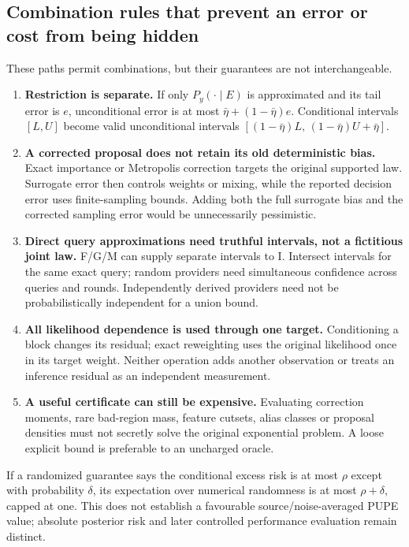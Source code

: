 \documentclass[10pt,a4paper]{article}
\begin{document}
\subsection{Combination rules that prevent an error or cost from being hidden}
These paths permit combinations, but their guarantees are not interchangeable.
\begin{enumerate}
\item \textbf{Restriction is separate.} If only $P_y(\cdot\mid E)$ is approximated and its tail error is $e$,
      unconditional error is at most $\bar\eta+(1-\bar\eta)e$. Conditional intervals $[L,U]$ become valid
      unconditional intervals $[(1-\bar\eta)L,\,(1-\bar\eta)U+\bar\eta]$.
\item \textbf{A corrected proposal does not retain its old deterministic bias.} Exact importance or
      Metropolis correction targets the original supported law. Surrogate error then controls weights or
      mixing, while the reported decision error uses finite-sampling bounds. Adding both the full surrogate
      bias and the corrected sampling error would be unnecessarily pessimistic.
\item \textbf{Direct query approximations need truthful intervals, not a fictitious joint law.} F/G/M can
      supply separate intervals to I. Intersect intervals for the same exact query; random providers need
      simultaneous confidence across queries and rounds. Independently derived providers need not be
      probabilistically independent for a union bound.
\item \textbf{All likelihood dependence is used through one target.} Conditioning a block changes its
      residual; exact reweighting uses the original likelihood once in its target weight. Neither operation
      adds another observation or treats an inference residual as an independent measurement.
\item \textbf{A useful certificate can still be expensive.} Evaluating correction moments, rare bad-region
      mass, feature cutsets, alias classes or proposal densities must not secretly solve the original
      exponential problem. A loose explicit bound is preferable to an uncharged oracle.
\end{enumerate}
If a randomized guarantee says the conditional excess risk is at most $\rho$ except with probability
$\delta$, its expectation over numerical randomness is at most $\rho+\delta$, capped at one.
This does not establish a favourable source/noise-averaged PUPE value; absolute posterior risk and later
controlled performance evaluation remain distinct.
\end{document}
